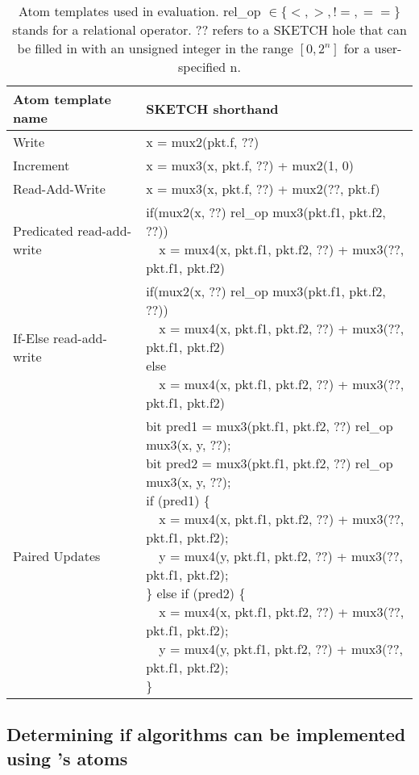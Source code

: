 \begin{table*}
  \begin{tabular}{|p{}|p{}|}
  \hline
  Atom template name & SKETCH shorthand\\
  \hline
  Write & x = mux2(pkt.f, ??) \\
  \hline
  Increment & x = mux3(x, pkt.f, ??) + mux2(1, 0)\\
  \hline
  Read-Add-Write & x = mux3(x, pkt.f, ??) + mux2(??, pkt.f) \\
  \hline
  Predicated read-add-write & \pbox{0.64\textwidth}{if(mux2(x, ??) rel\_op mux3(pkt.f1, pkt.f2, ??)) \\ \ \ x = mux4(x, pkt.f1, pkt.f2, ??) + mux3(??, pkt.f1, pkt.f2)}\\
  \hline
  If-Else read-add-write & \pbox{0.64\textwidth}{if(mux2(x, ??) rel\_op mux3(pkt.f1, pkt.f2, ??)) \\ \ \ x = mux4(x, pkt.f1, pkt.f2, ??) + mux3(??, pkt.f1, pkt.f2) \\ else \\ \ \ x = mux4(x, pkt.f1, pkt.f2, ??) + mux3(??, pkt.f1, pkt.f2)} \\
  \hline
  Paired Updates & \pbox{0.64\textwidth}{
  bit pred1 = mux3(pkt.f1, pkt.f2, ??) rel\_op mux3(x, y,  ??); \\
  bit pred2 = mux3(pkt.f1, pkt.f2, ??) rel\_op mux3(x, y,  ??); \\
  if (pred1) \{ \\
  \ \  x = mux4(x, pkt.f1, pkt.f2, ??) + mux3(??, pkt.f1, pkt.f2); \\
  \ \  y = mux4(y, pkt.f1, pkt.f2, ??) + mux3(??, pkt.f1, pkt.f2); \\
  \} else if (pred2) \{ \\
  \ \  x = mux4(x, pkt.f1, pkt.f2, ??) + mux3(??, pkt.f1, pkt.f2); \\
  \ \  y = mux4(y, pkt.f1, pkt.f2, ??) + mux3(??, pkt.f1, pkt.f2); \\
  \} \\
  } \\
  \hline
  \end{tabular}
  \caption{Atom templates used in evaluation. rel\_op $\in \{<, >, != , ==\}$ stands for a relational operator. ?? refers to a SKETCH hole that can be filled in with an unsigned integer in the range $[0, 2^n]$ for a user-specified n.}
  \label{tab:templates}
\end{table*}

\subsection{Determining if algorithms can be implemented using \absmachine's atoms}

